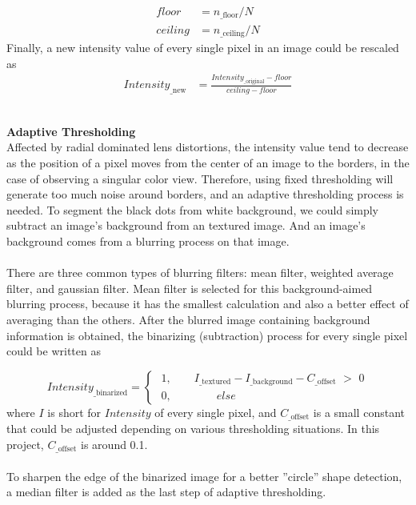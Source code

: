 %
\begin{equation}
%
\begin{aligned}
floor &=  n_{\text{\_floor}} / N%
\\%
ceiling &=  n_{\text{\_ceiling}} / N
\end{aligned}
\label{intensityFloorCeilingDetermination}
%
\end{equation}%
%
Finally, a new intensity value of every single pixel in an image could be rescaled as
%
\begin{equation}
%
\begin{aligned}
Intensity_{\text{\_new}} &= \frac{Intensity_{\text{\_original}} - floor}{ceiling - floor} 
\end{aligned}
%
\end{equation}%
%
%
\\\par%
 \qquad \textbf{Adaptive Thresholding}\\%
Affected by radial dominated lens distortions, the intensity value tend to decrease as the position of a pixel moves from the center of an image to the borders, in the case of observing a singular color view. Therefore, using fixed thresholding will generate too much noise around borders, and an adaptive thresholding process is needed. To segment the black dots from white background, we could simply subtract an image's background from an textured image. And an image's background comes from a blurring process on that image. \\\\%
%
There are three common types of blurring filters: mean filter, weighted average filter, and gaussian filter. Mean filter is selected for this background-aimed blurring process, because it has the smallest calculation and also a better effect of averaging than the others. After the blurred image containing background information is obtained, the binarizing (subtraction) process for every single pixel could be written as

\begin{equation}
%
Intensity_{\text{\_binarized}} = %
%
\begin{cases}
\,\, 1 , \quad \quad I_{\text{\_textured}} - I_{\text{\_background}}  -  C_{\text{\_offset}} \,\, > \,\,0 %
\\%
\,\, 0 , \quad \quad \quad \quad else%
\end{cases}
%
\end{equation}%
%
where \(I\) is short for \(Intensity\) of every single pixel, and \(C_{\text{\_offset}}\) is a small constant that could be adjusted depending on various thresholding situations. In this project, \(C_{\text{\_offset}}\) is around 0.1.%
\\\\%
To sharpen the edge of the binarized image for a better ''circle'' shape detection, a median filter is added as the last step of adaptive thresholding.
%
%
%
